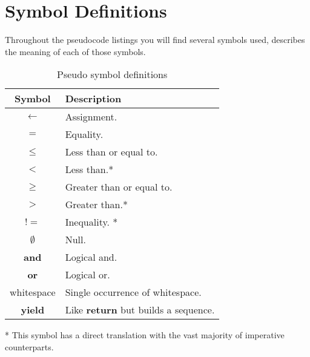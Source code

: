 \chapter{Symbol Definitions} \label{symbol_defs}
Throughout the pseudocode listings you will find several symbols used,  describes the meaning of each of those symbols.

\begin{table}[h]
\begin{center}
\begin{tabular}[t]{|c|l|}
\hline
\textbf{Symbol} & \textbf{Description} \\
\hline
$\leftarrow$ & Assignment. \\
\hline
$=$ & Equality. \\
\hline
$\leq$ & Less than or equal to.  \\
\hline
$<$ & Less than.* \\
\hline
$\geq$ & Greater than or equal to.  \\
\hline
$>$ & Greater than.* \\
\hline
$!=$ & Inequality. * \\
\hline
$\emptyset$ & Null. \\
\hline
\textbf{and} & Logical and.  \\
\hline
\textbf{or} & Logical or.  \\ 
\hline
whitespace & Single occurrence of whitespace. \\
\hline
\textbf{yield} & Like \textbf{return} but builds a sequence. \\
\hline
\end{tabular}
\end{center}
\caption{Pseudo symbol definitions}
\end{table}

* This symbol has a direct translation with the vast majority of imperative counterparts.

